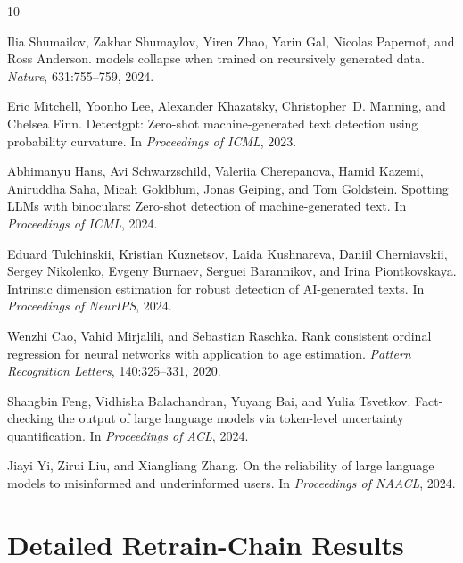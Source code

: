 \documentclass[11pt,a4paper]{article}
\begin{document}

\begin{thebibliography}{10}

Ilia Shumailov, Zakhar Shumaylov, Yiren Zhao, Yarin Gal, Nicolas Papernot, and Ross Anderson.
 models collapse when trained on recursively generated data.
\newblock \emph{Nature}, 631:755--759, 2024.

Eric Mitchell, Yoonho Lee, Alexander Khazatsky, Christopher~D. Manning, and Chelsea Finn.
\newblock Detectgpt: Zero-shot machine-generated text detection using probability curvature.
\newblock In \emph{Proceedings of ICML}, 2023.

Abhimanyu Hans, Avi Schwarzschild, Valeriia Cherepanova, Hamid Kazemi, Aniruddha Saha, Micah Goldblum, Jonas Geiping, and Tom Goldstein.
\newblock Spotting {LLM}s with binoculars: Zero-shot detection of machine-generated text.
\newblock In \emph{Proceedings of ICML}, 2024.

Eduard Tulchinskii, Kristian Kuznetsov, Laida Kushnareva, Daniil Cherniavskii, Sergey Nikolenko, Evgeny Burnaev, Serguei Barannikov, and Irina Piontkovskaya.
\newblock Intrinsic dimension estimation for robust detection of {AI}-generated texts.
\newblock In \emph{Proceedings of NeurIPS}, 2024.

Wenzhi Cao, Vahid Mirjalili, and Sebastian Raschka.
\newblock Rank consistent ordinal regression for neural networks with application to age estimation.
\newblock \emph{Pattern Recognition Letters}, 140:325--331, 2020.

Shangbin Feng, Vidhisha Balachandran, Yuyang Bai, and Yulia Tsvetkov.
\newblock Fact-checking the output of large language models via token-level uncertainty quantification.
\newblock In \emph{Proceedings of ACL}, 2024.

Jiayi Yi, Zirui Liu, and Xiangliang Zhang.
\newblock On the reliability of large language models to misinformed and underinformed users.
\newblock In \emph{Proceedings of NAACL}, 2024.

\end{thebibliography}

\appendix

\section{Detailed Retrain-Chain Results}
\label{app:retrain}
\end{document}

